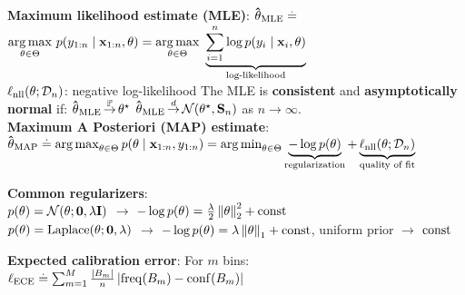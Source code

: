 \textbf{Maximum likelihood estimate (MLE)}: $\mathbf{\hat{\theta}}_{\mathrm{MLE}} \overset{.}{=}$
 $\underset{\mathbf{\theta} \in \Theta}{\operatorname*{arg\,max}}\ p(y_{1:n} \mid \mathbf{x}_{1:n}, \mathbf{\theta}) 
  = \underset{\mathbf{\theta} \in \Theta}{\operatorname*{arg\,max}}\ \underbrace{\sum_{i=1}^n \log p(y_i \mid \mathbf{x}_i, \mathbf{\theta})}_{\text{{log-likelihood}}}$ \\
$\ell_\mathrm{nll}(\mathbf{\theta}; \mathcal{D}_n)$: negative log-likelihood
The MLE is \textbf{consistent} and \textbf{asymptotically normal} if: $\mathbf{\hat{\theta}}_{\mathrm{MLE}} \operatorname*{\smash{\overset{\mathbb{P}}{\rightarrow}}} \mathbf{\theta}^\star$ $\vthetahat_\MLE \convd \N{\opt{\vtheta}}{\mS_n}$ as $n \to \infty$. \\
\textbf{{Maximum A Posteriori (MAP) estimate}}:   $\mathbf{\hat{\theta}}_{\mathrm{MAP}} \overset{.}{=} \operatorname*{arg\,max}_{\mathbf{\theta} \in \Theta} p(\mathbf{\theta} \mid \mathbf{x}_{1:n}, y_{1:n}) 
  = \operatorname*{arg\,min}_{\mathbf{\theta} \in \Theta} \underbrace{- \log p(\mathbf{\theta})}_{\text{regularization}} + \underbrace{\ell_\mathrm{nll}(\mathbf{\theta}; \mathcal{D}_n)}_{\text{quality of fit}}$
\begin{framed}
\textbf{Common regularizers}: \\
 $p(\vtheta) = \N[\vtheta]{\vzero}{\lambda \mI}$ $\rightarrow$ $-\log p(\vtheta) = \frac{\lambda}{2} \norm{\vtheta}_2^2 + \const$ \\
 $p(\vtheta) = \Laplace[\vtheta]{\vzero}{\lambda}$ $\rightarrow$ $-\log p(\vtheta) = \lambda \norm{\vtheta}_1 + \const$,
 uniform prior $\rightarrow$ $\mathrm{const}$
 \end{framed}
\begin{framed}
     \textbf{Expected calibration error}: For $m$ bins: $\ell_{\mathrm{ECE}} \overset{.}{=} \sum_{m=1}^M \frac{\left| B_m \right|}{n} \left| \mathrm{freq}(B_m) - \mathrm{conf}(B_m) \right|$
 \end{framed}


